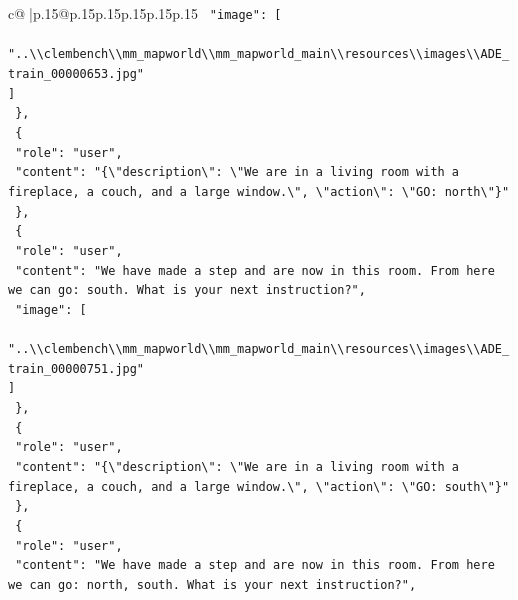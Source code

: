 \documentclass{article}
\begin{document}
{\begin{supertabular}{c@{$\;$}|p{.15\linewidth}@{}p{.15\linewidth}p{.15\linewidth}p{.15\linewidth}p{.15\linewidth}p{.15\linewidth}}
{{{\texttt{    "image": {[}} \\
\texttt{      "..\textbackslash{}\textbackslash{}clembench\textbackslash{}\textbackslash{}mm\_mapworld\textbackslash{}\textbackslash{}mm\_mapworld\_main\textbackslash{}\textbackslash{}resources\textbackslash{}\textbackslash{}images\textbackslash{}\textbackslash{}ADE\_train\_00000653.jpg"} \\
\texttt{    {]}} \\
\texttt{  \},} \\
\texttt{  \{} \\
\texttt{    "role": "user",} \\
\texttt{    "content": "\{\textbackslash{}"description\textbackslash{}": \textbackslash{}"We are in a living room with a fireplace, a couch, and a large window.\textbackslash{}", \textbackslash{}"action\textbackslash{}": \textbackslash{}"GO: north\textbackslash{}"\}"} \\
\texttt{  \},} \\
\texttt{  \{} \\
\texttt{    "role": "user",} \\
\texttt{    "content": "We have made a step and are now in this room. From here we can go: south. What is your next instruction?",} \\
\texttt{    "image": {[}} \\
\texttt{      "..\textbackslash{}\textbackslash{}clembench\textbackslash{}\textbackslash{}mm\_mapworld\textbackslash{}\textbackslash{}mm\_mapworld\_main\textbackslash{}\textbackslash{}resources\textbackslash{}\textbackslash{}images\textbackslash{}\textbackslash{}ADE\_train\_00000751.jpg"} \\
\texttt{    {]}} \\
\texttt{  \},} \\
\texttt{  \{} \\
\texttt{    "role": "user",} \\
\texttt{    "content": "\{\textbackslash{}"description\textbackslash{}": \textbackslash{}"We are in a living room with a fireplace, a couch, and a large window.\textbackslash{}", \textbackslash{}"action\textbackslash{}": \textbackslash{}"GO: south\textbackslash{}"\}"} \\
\texttt{  \},} \\
\texttt{  \{} \\
\texttt{    "role": "user",} \\
\texttt{    "content": "We have made a step and are now in this room. From here we can go: north, south. What is your next instruction?",} \\
}}}
\end{supertabular}}
\end{document}
